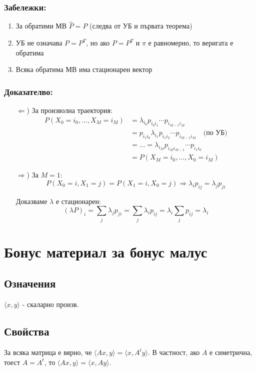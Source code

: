 \documentclass{article}
\begin{document}
\subsubsection*{Забележки:}
\begin{enumerate}
\item За обратими МВ $\hat{P} = P$ (следва от УБ и първата теорема)
\item УБ не означава $P = P^T$, но ако $P = P^T$ и $\pi$ е равномерно, то веригата е обратима
\item Всяка обратима МВ има стационарен вектор
\end{enumerate}

\subsubsection*{Доказателво:}
\begin{itemize}
\item[$\Leftarrow$)] За произволна траектория:
\begin{align*}
P(X_0=i_0, \dots, X_M=i_M) &= \lambda_{i_0} p_{i_0 i_1} \cdots p_{i_{M-1} i_M} \\
&= p_{i_1 i_0} \lambda_{i_1} p_{i_1 i_2} \cdots p_{i_{M-1} i_M} \quad \text{(по УБ)} \\
&= \dots = \lambda_{i_M} p_{i_M i_{M-1}} \cdots p_{i_1 i_0} \\
&= P(X_M=i_0, \dots, X_0=i_M)
\end{align*}

\item[$\Rightarrow$)] За $M=1$:
$$P(X_0=i, X_1=j) = P(X_1=i, X_0=j) \Rightarrow \lambda_i p_{ij} = \lambda_j p_{ji}$$

Доказваме $\lambda$ е стационарен:
$$(\lambda P)_i = \sum_j \lambda_j p_{ji} = \sum_j \lambda_i p_{ij} = \lambda_i \sum_j p_{ij} = \lambda_i$$
\end{itemize}

\section{Бонус материал за бонус малус}
\subsection{Означения}
$\langle x,y \rangle$ - скаларно произв.

\subsection{Свойства}
За всяка матрица е вярно, че $\langle Ax,y \rangle = \langle x,A^t y \rangle$. В частност, ако $A$ е симетрична, тоест $A=A^t$, то $\langle Ax,y \rangle = \langle x,Ay \rangle$.
\end{document}
